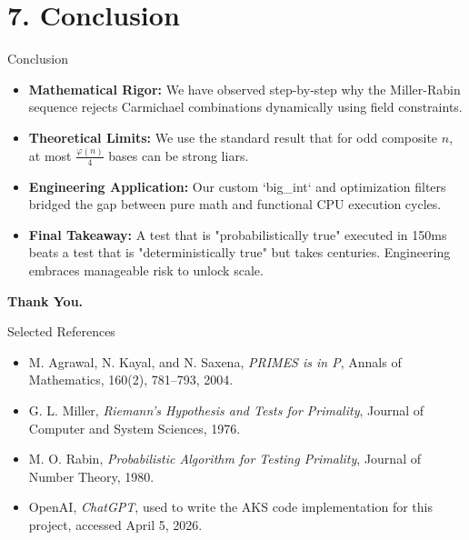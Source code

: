 \documentclass[10pt, compress]{beamer}
\begin{document}
\section{7. Conclusion}
\begin{frame}{Conclusion}
    \begin{itemize}
        \item<1-> \textbf{Mathematical Rigor:} We have observed step-by-step why the Miller-Rabin sequence rejects Carmichael combinations dynamically using field constraints.
        \item<2-> \textbf{Theoretical Limits:} We use the standard result that for odd composite $n$, at most $\frac{\varphi(n)}{4}$ bases can be strong liars.
        \item<3-> \textbf{Engineering Application:} Our custom `big\_int` and optimization filters bridged the gap between pure math and functional CPU execution cycles.
        \item<4-> \textbf{Final Takeaway:} A test that is "probabilistically true" executed in 150ms beats a test that is "deterministically true" but takes centuries. Engineering embraces manageable risk to unlock scale.
    \end{itemize}
    
    \vspace{1cm}
    \centering
    \Large \textbf{Thank You.}
\end{frame}
\begin{frame}{Selected References}
    \begin{itemize}
        \item M. Agrawal, N. Kayal, and N. Saxena, \textit{PRIMES is in P}, Annals of Mathematics, 160(2), 781--793, 2004.
        \item G. L. Miller, \textit{Riemann's Hypothesis and Tests for Primality}, Journal of Computer and System Sciences, 1976.
        \item M. O. Rabin, \textit{Probabilistic Algorithm for Testing Primality}, Journal of Number Theory, 1980.
        \item OpenAI, \textit{ChatGPT}, used to write the AKS code implementation for this project, accessed April 5, 2026.
    \end{itemize}
\end{frame}
\end{document}
